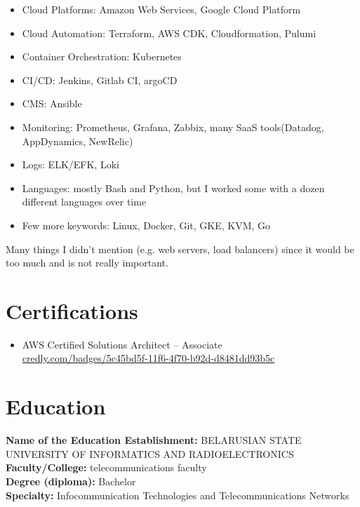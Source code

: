\documentclass[11pt]{letter}
\newcommand{\forceindent}{\leavevmode{\parindent=1em\indent} %
}
\begin{document}
\begin{itemize}
  \item Cloud Platforms: Amazon Web Services, Google Cloud Platform
  \item Cloud Automation: Terraform, AWS CDK, Cloudformation, Pulumi
  \item Container Orchestration: Kubernetes
  \item CI/CD: Jenkins, Gitlab CI, argoCD
  \item CMS: Ansible
  \item Monitoring: Prometheus, Grafana, Zabbix, many SaaS tools(Datadog, AppDynamics, NewRelic)
  \item Logs: ELK/EFK, Loki
  \item Languages: mostly Bash and Python, but I worked some with a dozen different languages over time
  \item Few more keywords: Linux, Docker, Git, GKE, KVM, Go
\end{itemize}

\forceindent Many things I didn't mention (e.g. web servers, load balancers) since it would be too much and is not really important.

\section*{Certifications\vphantom{certs}}

\begin{itemize}
    \item AWS Certified Solutions Architect – Associate \\
    \href{https://www.credly.com/badges/5c45bd5f-11f6-4f70-b92d-d8481dd93b5c}{credly.com/badges/5c45bd5f-11f6-4f70-b92d-d8481dd93b5c}
\end{itemize}

\section*{Education\vphantom{edu}}

\textbf{Name of the Education Establishment:} BELARUSIAN STATE UNIVERSITY OF INFORMATICS AND RADIOELECTRONICS \\
\textbf{Faculty/College:} telecommunications faculty \\
\textbf{Degree (diploma):} Bachelor \\
\textbf{Specialty:} Infocommunication Technologies and Telecommunications Networks \\
\end{document}
